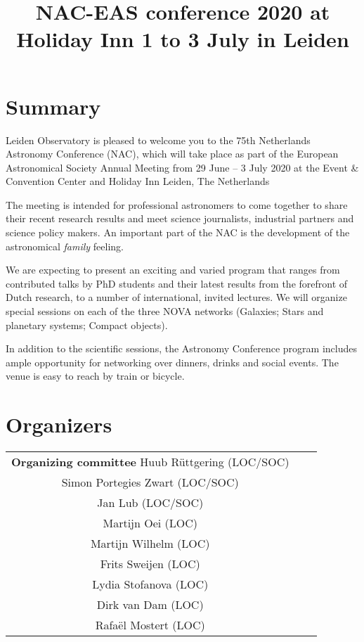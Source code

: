 \documentclass{article}
\title{NAC-EAS conference 2020 at Holiday Inn 1 to 3 July in Leiden}
\begin{document}
\maketitle

\section{Summary}

Leiden Observatory is pleased to welcome you to the 75th Netherlands
Astronomy Conference (NAC), which will take place as part of the
European Astronomical Society Annual Meeting from 29 June – 3 July
2020 at the Event \& Convention Center and Holiday Inn Leiden, The
Netherlands

The meeting is intended for professional astronomers to come together
to share their recent research results and meet science journalists,
industrial partners and science policy makers. An important part of
the NAC is the development of the astronomical {\em family} feeling.

We are expecting to present an exciting and varied program that ranges
from contributed talks by PhD students and their latest results from
the forefront of Dutch research, to a number of international, invited
lectures. We will organize special sessions on each of the three NOVA
networks (Galaxies; Stars and planetary systems; Compact
objects). 

In addition to the scientific sessions, the Astronomy Conference
program includes ample opportunity for networking over dinners, drinks
and social events. The venue is easy to reach by train or bicycle.

\section{Organizers}
\begin{center}
    \begin{tabular}{ccc}
        \textbf{Organizing committee}
        \hline
        Huub R\"uttgering (LOC/SOC)\\
        Simon Portegies Zwart (LOC/SOC)\\
        Jan Lub (LOC/SOC) \\
        Martijn Oei  (LOC) \\         
        Martijn Wilhelm (LOC) \\         
        Frits Sweijen          (LOC) \\         
        Lydia Stofanova (LOC) \\         
        Dirk van Dam  (LOC) \\         
        Rafa\"el Mostert  (LOC) \\         
    \end{tabular}
\end{center}
\end{document}

